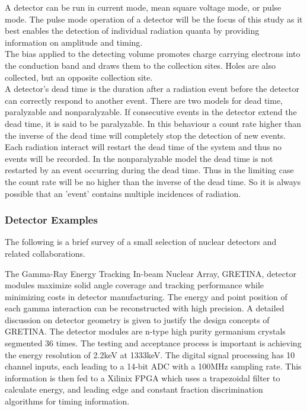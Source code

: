 \documentclass[12pt]{article}
\begin{document}
\begin{doublespacing}
A detector can be run in current mode, mean square voltage mode, or pulse mode. 
The pulse mode operation of a detector will be the focus of this study as it best enables the detection of individual radiation quanta by providing information on amplitude and timing.
\\

The bias applied to the detecting volume promotes charge carrying electrons into the conduction band and draws them to the collection sites. 
Holes are also collected, but an opposite collection site.
\\

A detector's dead time is the duration after a radiation event before the detector can correctly respond to another event.
There are two models for dead time, paralyzable and nonparalyzable. 
If consecutive events in the detector extend the dead time, it is said to be paralyzable. 
In this behaviour a count rate higher than the inverse of the dead time will completely stop the detection of new events. 
Each radiation interact will restart the dead time of the system and thus no events will be recorded. 
In the nonparalyzable model the dead time is not restarted by an event occurring during the dead time. 
Thus in the limiting case the count rate will be no higher than the inverse of the dead time.
So it is always possible that an 'event' contains multiple incidences of radiation.
\\

\subsubsection{Detector Examples}

The following is a brief survey of a small selection of nuclear detectors and related collaborations.

\citep{Paschalis201344}
The Gamma-Ray Energy Tracking In-beam Nuclear Array, GRETINA, detector modules maximize solid angle coverage and tracking performance while minimizing costs in detector manufacturing.
The energy and point position of each gamma interaction can be reconstructed with high precision.
A detailed discussion on detector geometry is given to justify the design concepts of GRETINA.
The detector modules are n-type high purity germanium crystals segmented 36 times.
The testing and acceptance process is important is achieving the energy resolution of 2.2keV at 1333keV.
The digital signal processing has 10 channel inputs, each leading to a 14-bit ADC with a 100MHz sampling rate.
This information is then fed to a Xilinix FPGA which uses a trapezoidal filter to calculate energy, and leading edge and constant fraction discrimination algorithms for timing information.


\end{doublespacing}
\end{document}
